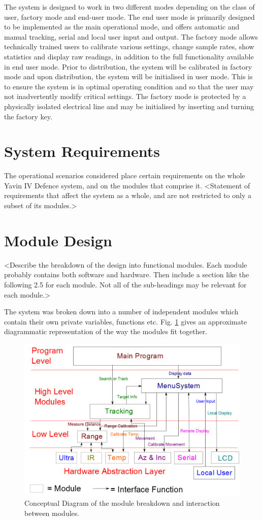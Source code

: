 \documentclass[]{report}
\begin{document}
The system is designed to work in two different modes depending on the class of user, factory mode and end-user mode.\newline
The end user mode is primarily designed to be implemented as the main operational mode, and offers automatic and manual tracking, serial and local user input and output. The factory mode allows technically trained users to calibrate various settings, change sample rates, show statistics and display raw readings, in addition to the full functionality available in end user mode.\newline
Prior to distribution, the system will be calibrated in factory mode and upon distribution, the system will be initialised in user mode. This is to ensure the system is in optimal operating condition and so that the user may not inadvertently modify critical settings. \newline
The factory mode is protected by a physically isolated electrical line and may be initialised by inserting and turning the factory key.

\section{System Requirements}
The operational scenarios considered place certain requirements on the whole Yavin IV Defence system, and on the modules that comprise it.
<Statement of requirements that affect the system as a whole, and are not restricted to only a subset of its modules.>

\section{Module Design}
<Describe the breakdown of the design into functional modules. Each module probably contains both software and hardware.
Then include a section like the following 2.5 for each module. Not all of the sub-headings may be relevant for each module.>

The system was broken down into a number of independent modules which contain their own private variables, functions etc. Fig. \ref{fig:Modules} gives an approximate diagrammatic representation of the way the modules fit together.

\begin{figure}
\centering
\includegraphics[width=0.7\linewidth]{../Diagrams/Modules}
\caption[Modules]{Conceptual Diagram of the module breakdown and interaction between modules.}
\label{fig:Modules}
\end{figure}
\end{document}
